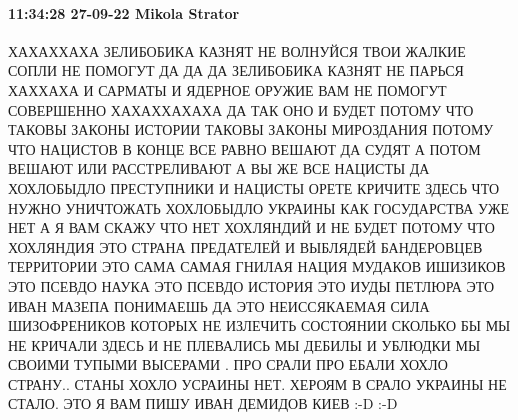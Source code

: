  
 
 
 
 

\paragraph{11:34:28 27-09-22 Mikola Strator}

ХАХАХХАХА ЗЕЛИБОБИКА КАЗНЯТ НЕ ВОЛНУЙСЯ ТВОИ ЖАЛКИЕ СОПЛИ НЕ ПОМОГУТ ДА ДА ДА
ЗЕЛИБОБИКА КАЗНЯТ НЕ ПАРЬСЯ ХАХХАХА И САРМАТЫ И ЯДЕРНОЕ ОРУЖИЕ ВАМ НЕ ПОМОГУТ
СОВЕРШЕННО ХАХАХХАХАХА ДА ТАК ОНО И БУДЕТ ПОТОМУ ЧТО ТАКОВЫ ЗАКОНЫ ИСТОРИИ
ТАКОВЫ ЗАКОНЫ МИРОЗДАНИЯ ПОТОМУ ЧТО НАЦИСТОВ В КОНЦЕ ВСЕ РАВНО ВЕШАЮТ ДА СУДЯТ
А ПОТОМ ВЕШАЮТ ИЛИ РАССТРЕЛИВАЮТ А ВЫ ЖЕ ВСЕ НАЦИСТЫ ДА ХОХЛОБЫДЛО ПРЕСТУПНИКИ
И НАЦИСТЫ ОРЕТЕ КРИЧИТЕ ЗДЕСЬ ЧТО НУЖНО УНИЧТОЖАТЬ ХОХЛОБЫДЛО  УКРАИНЫ КАК
ГОСУДАРСТВА УЖЕ НЕТ А Я ВАМ СКАЖУ ЧТО НЕТ  ХОХЛЯНДИЙ  И НЕ БУДЕТ   ПОТОМУ ЧТО
ХОХЛЯНДИЯ ЭТО СТРАНА ПРЕДАТЕЛЕЙ И ВЫБЛЯДЕЙ БАНДЕРОВЦЕВ ТЕРРИТОРИИ ЭТО САМА
САМАЯ ГНИЛАЯ НАЦИЯ  МУДАКОВ ИШИЗИКОВ ЭТО ПСЕВДО НАУКА ЭТО ПСЕВДО ИСТОРИЯ ЭТО
ИУДЫ ПЕТЛЮРА ЭТО ИВАН МАЗЕПА  ПОНИМАЕШЬ ДА ЭТО НЕИССЯКАЕМАЯ СИЛА ШИЗОФРЕНИКОВ
КОТОРЫХ НЕ ИЗЛЕЧИТЬ СОСТОЯНИИ СКОЛЬКО БЫ МЫ НЕ КРИЧАЛИ ЗДЕСЬ И НЕ ПЛЕВАЛИСЬ МЫ
ДЕБИЛЫ И УБЛЮДКИ МЫ СВОИМИ ТУПЫМИ ВЫСЕРАМИ . ПРО СРАЛИ ПРО ЕБАЛИ ХОХЛО СТРАНУ..
СТАНЫ ХОХЛО УСРАИНЫ НЕТ. ХЕРОЯМ В СРАЛО УКРАИНЫ НЕ СТАЛО. ЭТО Я ВАМ  ПИШУ ИВАН
ДЕМИДОВ КИЕВ :-D :-D
